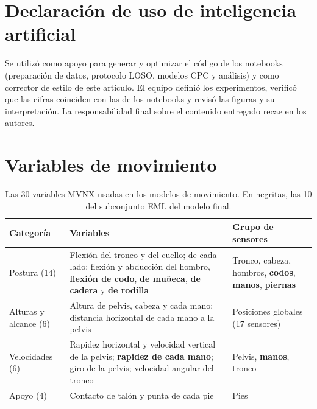 \documentclass[letterpaper,11pt]{article}
\begin{document}
\section*{Declaración de uso de inteligencia artificial}
Se utilizó \textcite{anthropic2026claude} como apoyo para generar y optimizar el código de los notebooks (preparación de datos, protocolo LOSO, modelos CPC y análisis) y como corrector de estilo de este artículo. El equipo definió los experimentos, verificó que las cifras coinciden con las de los notebooks y revisó las figuras y su interpretación. La responsabilidad final sobre el contenido entregado recae en los autores.

\printbibliography[title={Referencias}]

\clearpage
\appendix

\section{Variables de movimiento}
\label{anx:variables}
\begin{table}[H]
  \centering
  \small
  \caption{Las 30 variables MVNX usadas en los modelos de movimiento. En negritas, las 10 del subconjunto EML del modelo final.}
  \begin{tabular}{p{3.0cm}p{8.2cm}p{3.0cm}}
    \toprule
    Categoría & Variables & Grupo de sensores \\
    \midrule
    Postura (14) & Flexión del tronco y del cuello; de cada lado: flexión y abducción del hombro, \textbf{flexión de codo}, \textbf{de muñeca}, \textbf{de cadera} y \textbf{de rodilla} & Tronco, cabeza, hombros, \textbf{codos}, \textbf{manos}, \textbf{piernas} \\
    Alturas y alcance (6) & Altura de pelvis, cabeza y cada mano; distancia horizontal de cada mano a la pelvis & Posiciones globales (17 sensores) \\
    Velocidades (6) & Rapidez horizontal y velocidad vertical de la pelvis; \textbf{rapidez de cada mano}; giro de la pelvis; velocidad angular del tronco & Pelvis, \textbf{manos}, tronco \\
    Apoyo (4) & Contacto de talón y punta de cada pie & Pies \\
    \bottomrule
  \end{tabular}
\end{table}
\end{document}
